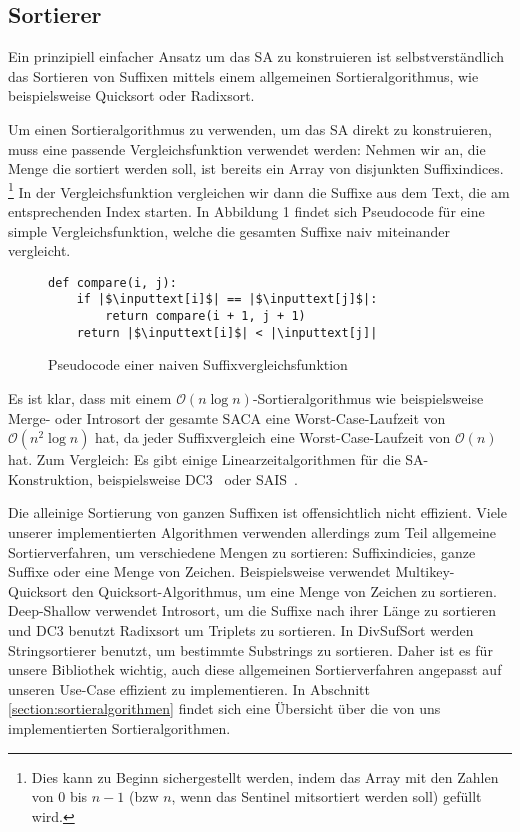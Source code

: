 \subsection{Sortierer}
Ein  prinzipiell einfacher Ansatz um das SA zu konstruieren
ist selbstverständlich das Sortieren von Suffixen mittels einem allgemeinen Sortieralgorithmus,
wie beispielsweise Quicksort oder Radixsort.

Um einen Sortieralgorithmus zu verwenden, um das SA direkt zu konstruieren,
muss eine passende Vergleichsfunktion verwendet werden:
Nehmen wir an, die Menge die sortiert werden soll, ist bereits ein Array von disjunkten Suffixindices.
\footnote{Dies kann zu Beginn sichergestellt werden, indem das
Array mit den Zahlen von 0 bis $n-1$ (bzw $n$, wenn das Sentinel mitsortiert werden soll) gefüllt wird.}
In der Vergleichsfunktion vergleichen wir dann die Suffixe aus dem Text, die am entsprechenden Index starten.
In Abbildung 1 findet sich Pseudocode für eine simple Vergleichsfunktion,
welche die gesamten Suffixe naiv miteinander vergleicht.

\begin{figure}[!h]
\begin{verbatim}
def compare(i, j):
    if |$\inputtext[i]$| == |$\inputtext[j]$|:
        return compare(i + 1, j + 1)
    return |$\inputtext[i]$| < |\inputtext[j]|
\end{verbatim}
\caption{Pseudocode einer naiven Suffixvergleichsfunktion}
\end{figure}
%
Es ist klar, dass mit einem $\mathcal O(n \log n)$-Sortieralgorithmus wie beispielsweise Merge- oder Introsort der gesamte SACA eine Worst-Case-Laufzeit von $\mathcal O(n^2 \log n)$ hat, da jeder Suffixvergleich eine Worst-Case-Laufzeit von $\mathcal O(n)$ hat.
Zum Vergleich: Es gibt einige Linearzeitalgorithmen für die SA-Konstruktion, beispielsweise DC3~\cite{saca:9} oder SAIS~\cite{saca:6}.

Die alleinige Sortierung von ganzen Suffixen ist offensichtlich nicht effizient.
Viele unserer implementierten Algorithmen verwenden allerdings zum Teil allgemeine Sortierverfahren,
um verschiedene Mengen zu sortieren: Suffixindicies, ganze Suffixe oder eine Menge von Zeichen.
Beispielsweise verwendet Multikey-Quicksort den Quicksort-Algorithmus, um eine Menge von Zeichen zu sortieren.
Deep-Shallow verwendet Introsort, um die Suffixe nach ihrer Länge zu sortieren
und DC3 benutzt Radixsort um Triplets zu sortieren.
In DivSufSort werden Stringsortierer benutzt, um bestimmte Substrings zu sortieren.
Daher ist es für unsere Bibliothek wichtig, auch diese allgemeinen Sortierverfahren angepasst
auf unseren Use-Case effizient zu implementieren.
In Abschnitt \ref{section:sortieralgorithmen} findet sich eine Übersicht über die von uns
implementierten Sortieralgorithmen.
